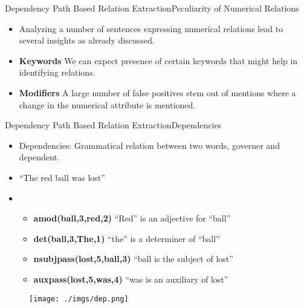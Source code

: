 \documentclass{beamer}
\begin{document}
\begin{frame}{Dependency Path Based Relation Extraction}{Peculiarity of Numerical Relations}
\begin{itemize}
 \item Analyzing a number of sentences expressing numerical relations lead to several insights as already discussed. \\
 \item \textbf{Keywords} We can expect presence of certain keywords that might help in identifying relations.\\
 \item \textbf{Modifiers} A large number of false positives stem out of mentions where a change in the numerical attribute is mentioned.
\end{itemize}
\end{frame}

\begin{frame}{Dependency Path Based Relation Extraction}{Dependencies}
\begin{itemize}
 \item Dependencies: Grammatical relation between two words, governer and dependent. \\
 \item ``The red ball was lost'' \\
\item \begin{itemize}
\item \textbf{amod(ball,3,red,2)} ``Red'' is an adjective for ``ball''
\item \textbf{det(ball,3,The,1)}  ``the'' is a determiner of ``ball''
\item \textbf{nsubjpass(lost,5,ball,3)}	``ball is the subject of lost''
\item \textbf{auxpass(lost,5,was,4)}	``was is an auxiliary of lost''
\end {itemize}
\end{itemize}
\begin{figure}[h]
 \centering
 \texttt{[image: ./imgs/dep.png]}
\end{figure}

\end{frame}
\end{document}
